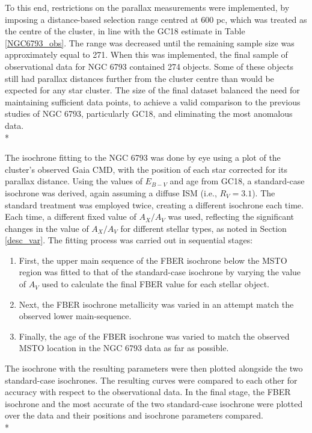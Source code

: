 \documentclass[12pt, a4paper]{report}
\begin{document}
To this end, restrictions on the parallax measurements were implemented, by imposing a distance-based selection range centred at 600 pc, which was treated as the centre of the cluster, in line with the GC18 estimate in Table \ref{NGC6793_obs}. The range was decreased until the remaining sample size was approximately equal to 271. When this was implemented, the final sample of observational data for NGC 6793 contained 274 objects. Some of these objects still had parallax distances further from the cluster centre than would be expected for any star cluster. The size of the final dataset balanced the need for maintaining sufficient data points, to achieve a valid comparison to the previous studies of NGC 6793, particularly GC18, and eliminating the most anomalous data.\\*

The isochrone fitting to the NGC 6793 was done by eye using a plot of the cluster's observed Gaia CMD, with the position of each star corrected for its parallax distance. Using the values of $E_{B-V}$ and age from GC18, a standard-case isochrone was derived, again assuming a diffuse ISM (i.e., $R_{V} = 3.1$). The standard treatment was employed twice, creating a different isochrone each time. Each time, a different fixed value of $A_{X}/A_{V}$ was used, reflecting the significant changes in the value of $A_{X}/A_{V}$ for different stellar types, as noted in Section \ref{desc_var}. The fitting process was carried out in sequential stages:

\begin{enumerate}
\item First, the upper main sequence of the FBER isochrone below the MSTO region was fitted to that of the standard-case isochrone by varying the value of $A_{V}$ used to calculate the final FBER value for each stellar object.
\item Next, the FBER isochrone metallicity was varied in an attempt match the observed lower main-sequence.
\item Finally, the age of the FBER isochrone was varied to match the observed MSTO location in the NGC 6793 data as far as possible.

\end{enumerate}

The isochrone with the resulting parameters were then plotted alongside the two standard-case isochrones. The resulting curves were compared to each other for accuracy with respect to the observational data. In the final stage, the FBER isochrone and the most accurate of the two standard-case isochrone were plotted over the data and their positions and isochrone parameters compared.\\*
\end{document}
